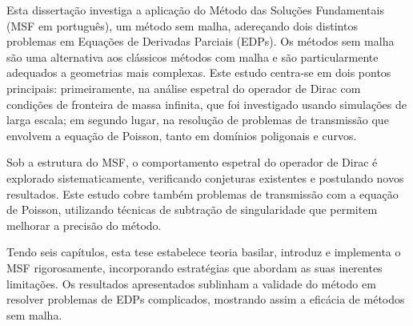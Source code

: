 \acresetall
\noindent
Esta dissertação investiga a aplicação do Método das Soluções Fundamentais (\ac{MSF} em português), um método sem malha, adereçando dois distintos problemas em Equações de Derivadas Parciais (EDPs). Os métodos sem malha são uma alternativa aos clássicos métodos com malha e são particularmente adequados a geometrias mais complexas. Este estudo centra-se em dois pontos principais: primeiramente, na análise espetral do operador de Dirac com condições de fronteira de massa infinita, que foi investigado usando simulações de larga escala; em segundo lugar, na resolução de problemas de transmissão que envolvem a equação de Poisson, tanto em domínios poligonais e curvos.

Sob a estrutura do \ac{MSF}, o comportamento espetral do operador de Dirac é explorado sistematicamente, verificando conjeturas existentes e postulando novos resultados. Este estudo cobre também problemas de transmissão com a equação de Poisson, utilizando técnicas de subtração de singularidade que permitem melhorar a precisão do método.

Tendo seis capítulos, esta tese estabelece teoria basilar, introduz e implementa o \ac{MSF} rigorosamente, incorporando estratégias que abordam as suas inerentes limitações. Os resultados apresentados sublinham a validade do método em resolver problemas de EDPs complicados, mostrando assim a eficácia de métodos sem malha.